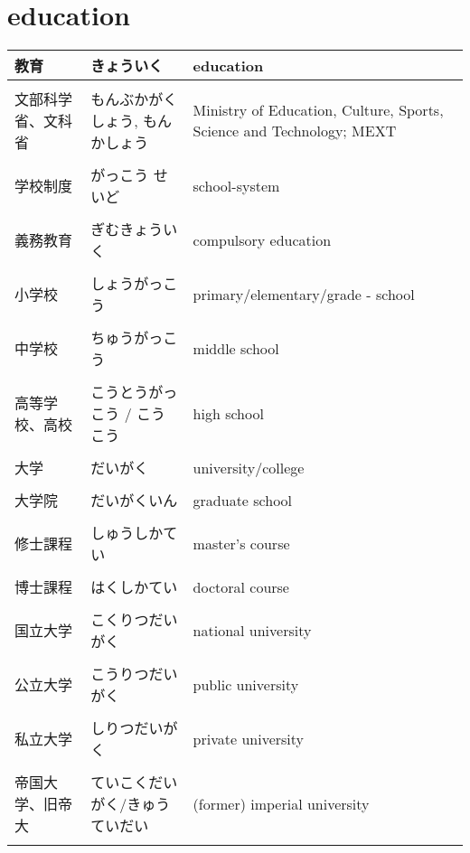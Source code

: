 \documentclass{article}
\newcommand\tabni[1][0.2cm]{\hspace*{#1}}
\begin{document}
\section{ \tabni education }
\begin{tabular}{ l | p{6.7cm} | p{7.5cm} }
教育 &  きょういく  & education \\ \hline \\[-1em]
文部科学省、文科省 &  もんぶかがくしょう, もんかしょう  & Ministry of Education, Culture, Sports, Science and Technology; MEXT \\ \hline \\[-1em]
学校制度 &  がっこう せいど   & school-system \\ \hline \\[-1em]
義務教育 &  ぎむきょういく  & compulsory education \\ \hline \\[-1em]
小学校 & しょうがっこう & primary/elementary/grade - school \\ \hline \\[-1em]
中学校 & ちゅうがっこう & middle school \\ \hline \\[-1em]
高等学校、高校 &  こうとうがっこう /  こうこう  & high school \\ \hline \\[-1em]
大学 &  だいがく  & university/college\\ \hline \\[-1em]
大学院  & だいがくいん  & graduate school \\ \hline \\[-1em]
修士課程  &  しゅうしかてい  & master's course \\ \hline \\[-1em]
博士課程  &  はくしかてい  & doctoral course \\ \hline \\[-1em]
国立大学 &  こくりつだいがく  & national university \\ \hline \\[-1em]
公立大学 &  こうりつだいがく  & public university\\ \hline \\[-1em]
私立大学 &  しりつだいがく & private university\\ \hline \\[-1em]
帝国大学、旧帝大 &  ていこくだいがく/きゅうていだい  & (former) imperial university \\ \hline \\[-1em]

\end{tabular}
\end{document}
